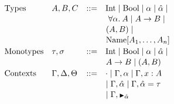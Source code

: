 \newcommand{\Inttype}{\text{Int}}
\newcommand{\Booltype}{\text{Bool}}
\begin{figure}[h]
  \centering
  \begin{minipage}{0.465\textwidth}
  \[
      \begin{array}{llcl}
      \text{Types} & A, B, C & \bnfas &
            \Inttype \bnfalt \Booltype \bnfalt \alpha \bnfalt \ahat \bnfalt 
            \\[1pt] &&&\!\!\!\;\;\;
            \alltype{\alpha}{A} \bnfalt A \arr B \bnfalt
            \\[1pt] &&&\!\!\!\;\;
            (A, B) \bnfalt
            \\[1pt] &&&\!\!\!\;\;
            \Unionname[A_1, \dots, A_n]
      \\[2pt]
      \text{Monotypes} & \tau,\sigma & \bnfas &
            \Inttype \bnfalt \Booltype \bnfalt \alpha \bnfalt \ahat \bnfalt 
            \\[1pt] &&&\!\!\!\;\;
            A \arr B \bnfalt (A, B)
        \\[2pt]
      \text{Contexts} & \Gamma, \Delta, \Theta & \bnfas &
                  \cdot
                  \bnfalt \Gamma, \alpha 
                  \bnfalt \Gamma, x:A
                  \\[1pt] &&&\!\!\!\;\;
                  \bnfalt \Gamma, \ahat
                  \bnfalt \Gamma, \hypeq{\ahat}{\tau}
                  \\[1pt] &&&\!\!\!\;\;
                  \bnfalt \Gamma, \MonnierComma{\ahat}
      \end{array}
  \]
  

\end{minipage}
\end{figure}
